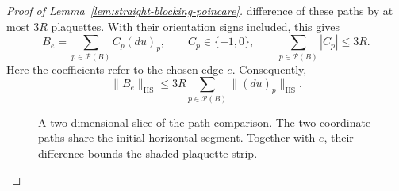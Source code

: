 \documentclass[10pt,reqno]{amsart}
\theoremstyle{definition}
\theoremstyle{remark}
\numberwithin{equation}{section}
\numberwithin{figure}{section}
\begin{document}
\begin{proof}[Proof of Lemma~\ref{lem:straight-blocking-poincare}]
difference of these paths by at most $3R$ plaquettes. With their orientation
signs included, this gives
\begin{equation}\label{eq:poincare-plaquette-sum}
B_e=\sum_{p\in\mathcal P(B)}C_p(du)_p,\qquad
C_p\in\{-1,0\},\qquad
\sum_{p\in\mathcal P(B)}|C_p|\le3R.
\end{equation}
Here the coefficients refer to the chosen edge $e$. Consequently,
\begin{equation}\label{eq:poincare-local-curl-bound}
\boxed{\|B_e\|_{\mathrm{HS}}
\le3R\sum_{p\in\mathcal P(B)}\|(du)_p\|_{\mathrm{HS}}.}
\end{equation}
\begin{figure}[htbp]
\centering
{}
\caption{A two-dimensional slice of the path comparison. The two coordinate
paths share the initial horizontal segment. Together with $e$, their
difference bounds the shaded plaquette strip.}
\label{fig:poincare-path-comparison}
\end{figure}


\end{proof}
\end{document}
